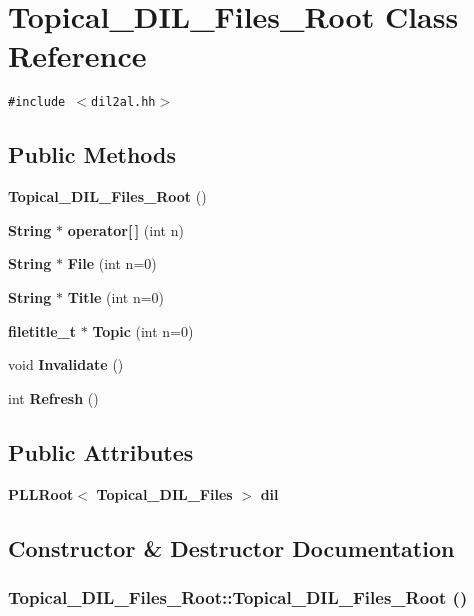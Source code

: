 \section{Topical\_\-DIL\_\-Files\_\-Root  Class Reference}
\label{classTopical__DIL__Files__Root}
{\tt \#include $<$dil2al.hh$>$}

\subsection*{Public Methods}
\begin{CompactItemize}
\item 
{\bf Topical\_\-DIL\_\-Files\_\-Root} ()
\item 
{\bf String} $\ast$ {\bf operator[$\,$]} (int n)
\item 
{\bf String} $\ast$ {\bf File} (int n=0)
\item 
{\bf String} $\ast$ {\bf Title} (int n=0)
\item 
{\bf filetitle\_\-t} $\ast$ {\bf Topic} (int n=0)
\item 
void {\bf Invalidate} ()
\item 
int {\bf Refresh} ()
\end{CompactItemize}
\subsection*{Public Attributes}
\begin{CompactItemize}
\item 
{\bf PLLRoot}$<$ {\bf Topical\_\-DIL\_\-Files} $>$ {\bf dil}
\end{CompactItemize}


\subsection{Constructor \& Destructor Documentation}
\subsubsection{\setlength{\rightskip}{0pt plus 5cm}Topical\_\-DIL\_\-Files\_\-Root::Topical\_\-DIL\_\-Files\_\-Root ()\hspace{0.3cm}{\tt  [inline]}}\label{classTopical__DIL__Files__Root_a0}




